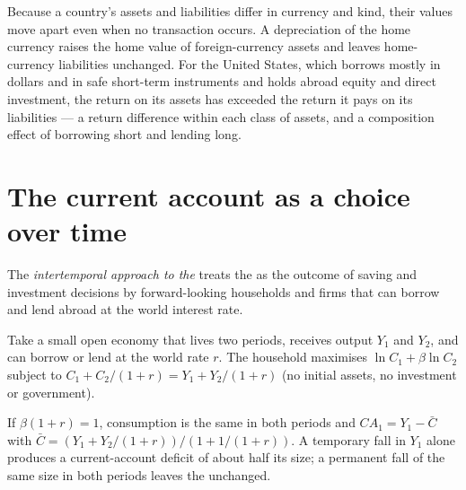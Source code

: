 \begin{measure}
Because a country's assets and liabilities differ in currency and kind, their
values move apart even when no transaction occurs. A depreciation of the home
currency raises the home value of foreign-currency assets and leaves
home-currency liabilities unchanged. For the United States, which borrows mostly
in dollars and in safe short-term instruments and holds abroad equity and direct
investment, the return on its assets has exceeded the return it pays on its
liabilities --- a return difference within each class of assets, and a composition
effect of borrowing short and lending long. %
\end{measure}

\section{The current account as a choice over time}\label{sec:b3:current-account:intertemporal}

\begin{definition}\label{def:b3:current-account:intertemporal}
The \emph{intertemporal approach to the } treats the 
as the outcome of saving and investment decisions by forward-looking households
and firms that can borrow and lend abroad at the world interest rate.
\end{definition}

Take a small open economy that lives two periods, receives output $Y_1$ and $Y_2$,
and can borrow or lend at the world rate $r$. The household maximises $\ln C_1 + \beta
\ln C_2$ subject to $C_1 + C_2/(1 + r) = Y_1 + Y_2/(1 + r)$ (no initial assets, no
investment or government).

\begin{proposition}\label{prop:b3:current-account:temporary}
If $\beta(1 + r) = 1$, consumption is the same in both periods and $CA_1 = Y_1 - \bar C$ with
$\bar C = (Y_1 + Y_2/(1 + r))/(1 + 1/(1 + r))$. A temporary fall in $Y_1$ alone produces a
current-account deficit of about half its size; a permanent fall of the same size
in both periods leaves the  unchanged.
\end{proposition}

